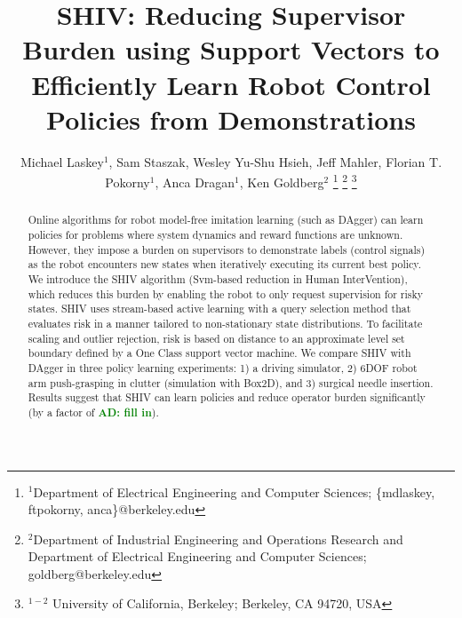 \documentclass[10pt, conference]{ieeeconf}      %
\title{SHIV: Reducing Supervisor Burden using Support Vectors to Efficiently Learn Robot Control Policies from Demonstrations}
\author{Michael Laskey$^1$, Sam Staszak, Wesley Yu-Shu Hsieh, Jeff Mahler, Florian T. Pokorny$^1$, Anca Dragan$^1$, Ken Goldberg$^2$%
\thanks{$^1$Department of Electrical Engineering and Computer Sciences; {\small \{mdlaskey, ftpokorny, anca\}@berkeley.edu}}%
\thanks{$^2$Department of Industrial Engineering and Operations Research and Department of Electrical Engineering and Computer Sciences; {\small goldberg@berkeley.edu}}%
\thanks{$^{1-2}$ University of California, Berkeley;  Berkeley, CA 94720, USA}%
}
\newcommand{\adnote}[1]{\ifthenelse{\boolean{include-notes}}%
 {\textcolor{green}{\textbf{AD: #1}}}{}}
\begin{document}
\maketitle
\thispagestyle{empty}
\pagestyle{empty}



\begin{abstract}
Online algorithms for robot model-free imitation learning (such as DAgger) can learn policies for problems where system
dynamics and reward functions are unknown. However, they impose a burden on supervisors to demonstrate labels (control
signals) as the robot encounters new states when iteratively executing its current best policy. We introduce the SHIV
algorithm (Svm-based reduction in Human InterVention), which reduces this burden by enabling the robot to only request supervision for risky states. SHIV uses stream-based active learning with a query selection method that evaluates risk in a manner tailored to non-stationary state distributions.  To facilitate scaling and outlier rejection, risk is based on distance to an approximate level set boundary defined by a One Class support vector machine.  We compare SHIV with DAgger in three policy learning experiments: 1) a driving simulator, 2) 6DOF robot arm push-grasping in clutter (simulation with Box2D), and 3) surgical needle insertion.  Results suggest that SHIV can learn policies and reduce operator burden significantly  (by a factor of \adnote{fill in}).%





\end{abstract}
\end{document}
